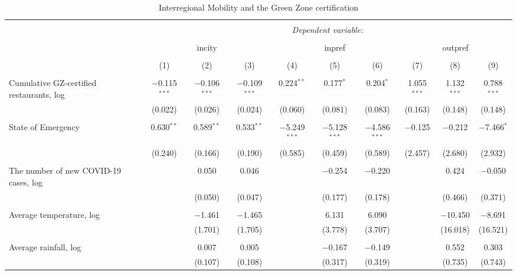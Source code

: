 
\begin{sidewaystable}[!htbp] \centering 
  \caption{Interregional Mobility and the Green Zone certification} 
  \label{} 
\footnotesize 
\begin{tabular}{@{\extracolsep{1pt}}lccccccccc} 
\\[-1.8ex]\hline 
\hline \\[-1.8ex] 
 & \multicolumn{9}{c}{\textit{Dependent variable:}} \\ 
\cline{2-10} 
\\[-1.8ex] & \multicolumn{3}{c}{incity} & \multicolumn{3}{c}{inpref} & \multicolumn{3}{c}{outpref} \\ 
\\[-1.8ex] & (1) & (2) & (3) & (4) & (5) & (6) & (7) & (8) & (9)\\ 
\hline \\[-1.8ex] 
 Cumulative GZ-certified restaurants, log & $-$0.115$^{***}$ & $-$0.106$^{***}$ & $-$0.109$^{***}$ & 0.224$^{**}$ & 0.177$^{*}$ & 0.204$^{*}$ & 1.055$^{***}$ & 1.132$^{***}$ & 0.788$^{***}$ \\ 
  & (0.022) & (0.026) & (0.024) & (0.060) & (0.081) & (0.083) & (0.163) & (0.148) & (0.148) \\ 
  & & & & & & & & & \\ 
 State of Emergency & 0.630$^{**}$ & 0.589$^{**}$ & 0.533$^{**}$ & $-$5.249$^{***}$ & $-$5.128$^{***}$ & $-$4.586$^{***}$ & $-$0.125 & $-$0.212 & $-$7.466$^{*}$ \\ 
  & (0.240) & (0.166) & (0.190) & (0.585) & (0.459) & (0.589) & (2.457) & (2.680) & (2.932) \\ 
  & & & & & & & & & \\ 
 The number of new COVID-19 cases, log &  & 0.050 & 0.046 &  & $-$0.254 & $-$0.220 &  & 0.424 & $-$0.050 \\ 
  &  & (0.050) & (0.047) &  & (0.177) & (0.178) &  & (0.466) & (0.371) \\ 
  & & & & & & & & & \\ 
 Average temperature, log &  & $-$1.461 & $-$1.465 &  & 6.131 & 6.090 &  & $-$10.450 & $-$8.691 \\ 
  &  & (1.701) & (1.705) &  & (3.778) & (3.707) &  & (16.018) & (16.521) \\ 
  & & & & & & & & & \\ 
 Average rainfall, log &  & 0.007 & 0.005 &  & $-$0.167 & $-$0.149 &  & 0.552 & 0.303 \\ 
  &  & (0.107) & (0.108) &  & (0.317) & (0.319) &  & (0.735) & (0.743) \\ 

\end{tabular}
\end{sidewaystable}
